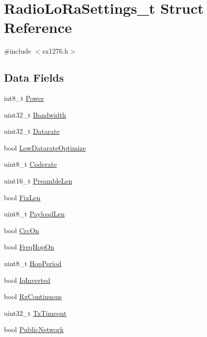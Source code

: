 \hypertarget{structRadioLoRaSettings__t}{}\section{Radio\+Lo\+Ra\+Settings\+\_\+t Struct Reference}
\label{structRadioLoRaSettings__t}


{\ttfamily \#include $<$sx1276.\+h$>$}

\subsection*{Data Fields}
\begin{DoxyCompactItemize}
\item 
int8\+\_\+t \hyperlink{structRadioLoRaSettings__t_a2d45281a97381855b07a79840f611f34}{Power}
\item 
uint32\+\_\+t \hyperlink{structRadioLoRaSettings__t_a42ab9ad47422b1696344e67d166873ea}{Bandwidth}
\item 
uint32\+\_\+t \hyperlink{structRadioLoRaSettings__t_a1c926a0aa998831f4a7f4ef6cfa49708}{Datarate}
\item 
bool \hyperlink{structRadioLoRaSettings__t_a6195eab2e1d7366eb3453c5375ece6ab}{Low\+Datarate\+Optimize}
\item 
uint8\+\_\+t \hyperlink{structRadioLoRaSettings__t_aa9ecb4fe5bd4b59a3f39a014d7e9e855}{Coderate}
\item 
uint16\+\_\+t \hyperlink{structRadioLoRaSettings__t_ae5b5eb13b52dcd2a2516b4e1a4a4fced}{Preamble\+Len}
\item 
bool \hyperlink{structRadioLoRaSettings__t_ad50e9f15a40cab22757e7e1835d9802b}{Fix\+Len}
\item 
uint8\+\_\+t \hyperlink{structRadioLoRaSettings__t_a734bfa731a3affc860d6b077ac4ad142}{Payload\+Len}
\item 
bool \hyperlink{structRadioLoRaSettings__t_af736b89b6f61528616a38e8b5df56876}{Crc\+On}
\item 
bool \hyperlink{structRadioLoRaSettings__t_ae44ae053dbe3bf809741ddf9fa56ce4a}{Freq\+Hop\+On}
\item 
uint8\+\_\+t \hyperlink{structRadioLoRaSettings__t_afa37d17a412bf644fa2c57d0b40e5839}{Hop\+Period}
\item 
bool \hyperlink{structRadioLoRaSettings__t_ae2601985400338276b08a8c16679a5a0}{Iq\+Inverted}
\item 
bool \hyperlink{structRadioLoRaSettings__t_ae90a4c6f7778ad72090e1a1ea16b0ef2}{Rx\+Continuous}
\item 
uint32\+\_\+t \hyperlink{structRadioLoRaSettings__t_a8716cd3a0d9f6cf4b770ca401c033845}{Tx\+Timeout}
\item 
bool \hyperlink{structRadioLoRaSettings__t_a82300f7565c603d5da9e6bebda1e5e52}{Public\+Network}
\end{DoxyCompactItemize}


